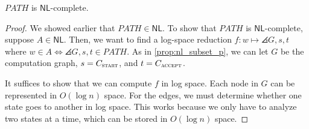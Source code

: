 \documentclass{standalone}
\begin{document}
\begin{theorem}
  \(\textit{PATH}\) is \(\mathsf{NL}\)-complete.
\end{theorem}
\begin{proof}
  We showed earlier that \(\textit{PATH} \in \mathsf{NL}\).
  To show that \(\textit{PATH}\) is \(\mathsf{NL}\)-complete,
  suppose \(A \in \mathsf{NL}\).
  Then, we want to find a log-space reduction
  \(f \colon w \mapsto \angles{G, s, t}\)
  where \(w \in A \iff \angles{G, s, t} \in \textit{PATH}\).
  As in \cref{prop:nl_subset_p}, we can let \(G\) be the computation graph,
  \(s = C_{\textsc{start}}\), and \(t = C_{\textsc{accept}}\).

  It suffices to show that we can compute \(f\) in log space.
  Each node in \(G\) can be represented in \(O(\log n)\) space.
  For the edges, we must determine
  whether one state goes to another in log space.
  This works because we only have to analyze two states at a time,
  which can be stored in \(O(\log n)\) space.
\end{proof}
\end{document}
